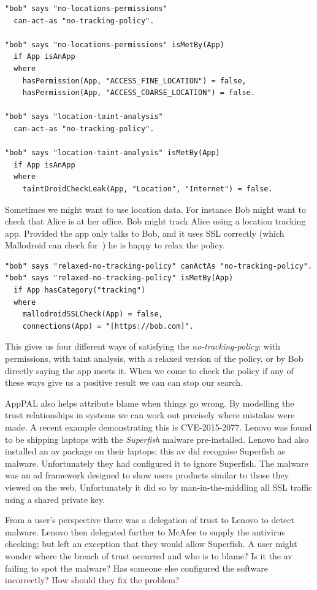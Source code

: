 \documentclass[]{scrartcl}
\begin{document}
\begin{lstlisting}
"bob" says "no-locations-permissions"
  can-act-as "no-tracking-policy".

"bob" says "no-locations-permissions" isMetBy(App)
  if App isAnApp
  where
    hasPermission(App, "ACCESS_FINE_LOCATION") = false,
    hasPermission(App, "ACCESS_COARSE_LOCATION") = false.

"bob" says "location-taint-analysis"
  can-act-as "no-tracking-policy".

"bob" says "location-taint-analysis" isMetBy(App)
  if App isAnApp
  where
    taintDroidCheckLeak(App, "Location", "Internet") = false.
\end{lstlisting}

Sometimes we might want to use location data.
For instance Bob might want to check that Alice is at her office.
Bob might track Alice using a location tracking app.
Provided the app only talks to Bob, and it uses SSL correctly (which Mallodroid can check for~\citep{Fahl:2012dj}) he is happy to relax the policy.

\begin{lstlisting}
"bob" says "relaxed-no-tracking-policy" canActAs "no-tracking-policy".
"bob" says "relaxed-no-tracking-policy" isMetBy(App)
  if App hasCategory("tracking")
  where
    mallodroidSSLCheck(App) = false,
    connections(App) = "[https://bob.com]".
\end{lstlisting}

This gives us four different ways of satisfying the \emph{no-tracking-policy}:
  with permissions,
  with taint analysis,
  with a relaxed version of the policy,
  or by Bob directly saying the app meets it.
When we come to check the policy if any of these ways give us a positive result we can can stop our search.

AppPAL also helps attribute blame when things go wrong.
By modelling the trust relationships in systems we can work out precisely where mistakes were made.
A recent example demonstrating this is \textsc{CVE-2015-2077}.
Lenovo was found to be shipping laptops with the \emph{Superfish} malware pre-installed.
Lenovo had also installed an \ac{av} package on their laptops; this \ac{av} did recognise Superfish as malware.
Unfortunately they had configured it to ignore Superfish.
The malware was an ad framework designed to show users products similar to those they viewed on the web.
Unfortunately it did so by man-in-the-middling all SSL traffic using a shared private key.

From a user's perspective there was a delegation of trust to Lenovo to detect malware.
Lenovo then delegated further to McAfee to supply the antivirus checking; but left an exception that they would allow Superfish.
A user might wonder where the breach of trust occurred and who is to blame?
Is it the \ac{av} failing to spot the malware?
Has someone else configured the software incorrectly?
How should they fix the problem?
\end{document}
